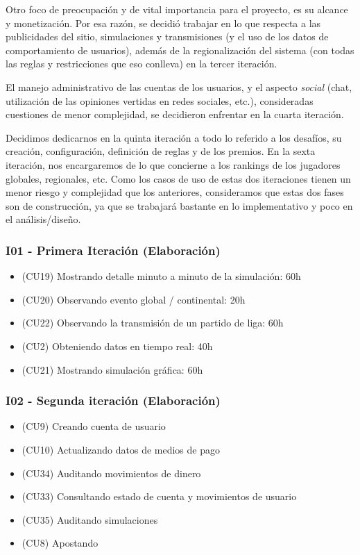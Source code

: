 Otro foco de preocupación y de vital importancia para el proyecto, es su alcance y monetización. Por esa razón, se decidió trabajar en lo que respecta a las publicidades del sitio, simulaciones y transmisiones (y el uso de los datos de comportamiento de usuarios), además de la regionalización del sistema (con todas las reglas y restricciones que eso conlleva) en la tercer iteración.

El manejo administrativo de las cuentas de los usuarios, y el aspecto \emph{social} (chat, utilización de las opiniones vertidas en redes sociales, etc.), consideradas cuestiones de menor complejidad, se decidieron enfrentar en la cuarta iteración.

Decidimos dedicarnos en la quinta iteración a todo lo referido a los desafíos, su creación, configuración, definición de reglas y de los premios. En la sexta iteración, nos encargaremos de lo que concierne a los rankings de los jugadores globales, regionales, etc. Como los casos de uso de estas dos iteraciones tienen un menor riesgo y complejidad que los anteriores, consideramos que estas dos fases son de construcción, ya que se trabajará bastante en lo implementativo y poco en el análisis/diseño.



\subsubsection{I01 - Primera Iteración (Elaboración)}
\begin{itemize}
\item (CU19) Mostrando detalle minuto a minuto de la simulación: 60h
\item (CU20) Observando evento global / continental: 20h
\item (CU22) Observando la transmisión de un partido de liga: 60h
\item (CU2)  Obteniendo datos en tiempo real: 40h
\item (CU21) Mostrando simulación gráfica: 60h
\end{itemize}

\subsubsection{I02 - Segunda iteración (Elaboración)} 
\begin{itemize}
\item (CU9) Creando cuenta de usuario
\item (CU10) Actualizando datos de medios de pago
\item (CU34) Auditando movimientos de dinero
\item (CU33) Consultando estado de cuenta y movimientos de usuario
\item (CU35) Auditando simulaciones
\item (CU8) Apostando
\end{itemize}


